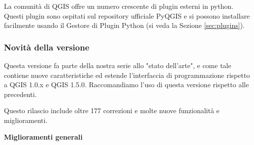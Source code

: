
La comunità di QGIS offre un numero crescente di plugin esterni in python. Questi plugin sono 
ospitati sul repository ufficiale PyQGIS e si possono installare facilmente usando il 
Gestore di Plugin Python (si veda la Sezione \ref{sec:plugins}).

\subsubsection{Novità della versione \CURRENT} 

Questa versione fa parte della nostra serie allo "stato dell'arte", e come tale contiene nuove 
caratteristiche ed estende l'interfaccia di programmazione rispetto a QGIS 1.0.x e QGIS 1.5.0. 
Raccomandiamo l'uso di questa versione rispetto alle precedenti.

Questo rilascio include oltre 177 correzioni e molte nuove funzionalità e miglioramenti.  

\textbf{Miglioramenti generali}

